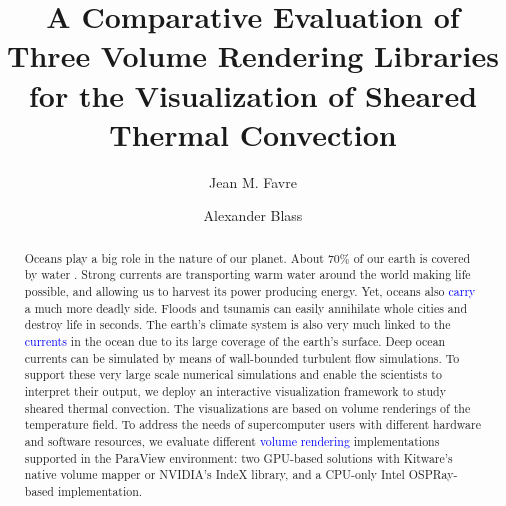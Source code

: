\documentclass[5p,times]{elsarticle}
\begin{document}
\begin{frontmatter}



\title{A Comparative Evaluation of Three Volume Rendering Libraries for the Visualization of Sheared Thermal Convection}


\author[CSCS]{Jean M. Favre}


\author[Twente]{Alexander Blass}

\address[CSCS]{Swiss National Supercomputing Center (CSCS), Via Trevano 131, CH-6900 Lugano, Switzerland}
\address[Twente]{Physics of Fluids Group, Max Planck Center for Complex Fluid Dynamics,
J. M. Burgers Center for Fluid Dynamics and MESA+ Research Institute,
Department of Science and Technology,
University of Twente, P.O. Box 217, 7500 AE Enschede, The Netherlands}

\begin{abstract}
Oceans play a big role in the nature of our planet. About $ 70 \% $ of our earth
is covered by water \cite{int14}. Strong currents are transporting warm water around the world making life possible, and allowing us to harvest its
power producing energy. Yet, oceans also
\textcolor{blue}{carry} a much more deadly side. Floods and tsunamis can easily annihilate whole
cities and destroy life in seconds. The earth's climate system is also very much
linked to the \textcolor{blue}{currents} in the ocean due to its large coverage of the earth's surface.
Deep ocean currents can be simulated by means of wall-bounded turbulent flow simulations.
To support these very large scale numerical simulations and enable the scientists to interpret their output,
we deploy an interactive visualization framework to study sheared thermal convection.
The visualizations are based on volume renderings of the temperature field.
To address the needs of supercomputer users with different hardware and software resources,
we evaluate different \textcolor{blue}{volume rendering} implementations supported in the ParaView \cite{Ahrens2005} environment:
two GPU-based solutions with Kitware's native volume mapper or NVIDIA's IndeX library,
and a CPU-only Intel OSPRay-based implementation.


\end{abstract}
\end{frontmatter}
\end{document}
